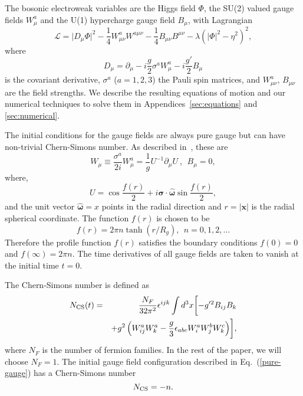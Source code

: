 \documentclass[prd,twocolumn,nofootinbib]{revtex4-1}
\newcommand{\be}{\begin{equation}}
\newcommand{\ee}{\end{equation}}
\begin{document}
The bosonic electroweak variables are the Higgs field $\Phi$, the SU(2) valued gauge
fields $W^a_\mu$ and the U(1) hypercharge gauge field $B_\mu$, with Lagrangian
\begin{equation}
\mathcal{L}=\vert D_\mu \Phi\vert^2-\frac{1}{4} W^a_{\mu\nu} W^{a\mu\nu} 
                    - \frac{1}{4} B_{\mu\nu} B^{\mu\nu} -\lambda (\vert \Phi \vert^2 -\eta^2)^2,
\label{lagrangian}
\end{equation}
where
\be
D_\mu = \partial_\mu - i \frac{g}{2} \sigma^a W^a_\mu - i \frac{g'}{2} B_\mu
\ee
is the covariant derivative,
$\sigma^a$ ($a=1,2,3$) the Pauli spin matrices,
and $W^a_{\mu \nu}$, $B_{\mu \nu}$ are the field strengths.
We describe the resulting equations of motion and our numerical techniques to solve them
in Appendices~\ref{sec:equations} and \ref{sec:numerical}.

The initial conditions for the gauge fields are always pure gauge but can have
non-trivial Chern-Simons number. As described in~\cite{jackiw2000creation}, these are
\begin{equation}
W_\mu \equiv \frac{ \sigma^a}{2i}W^a_{\mu} = \frac{1}{g}U^{-1} \partial_\mu U \ , \ \ B_\mu =0,
\label{pure-gauge}
\end{equation}
where, 
\begin{equation}
U = \cos\frac{f(r)}{2} +i\bm{\sigma}\cdot \hat{\bm{\omega}} 
	\sin \frac{f(r)}{2},
\label{su2-mat}
\end{equation}
and the unit vector $\hat{\bm{\omega}}={\hat x}$ points in the radial direction
and $r=|{\bm x}|$ is the radial spherical coordinate.
The function $f(r)$ is chosen to be
\begin{equation}
f(r) = 2\pi n \tanh(r/R_g), \ \ n=0,1,2,\ldots
\label{fr}
\end{equation}
Therefore the profile function $f(r)$  satisfies the boundary conditions $f(0)=0$ and $f(\infty)=2\pi n$. 
The time derivatives of all gauge fields are taken to vanish at the initial time $t=0$. 

The Chern-Simons number is defined as
\begin{eqnarray}
\nonumber N_{\rm CS}(t) &=& \frac{N_F}{32\pi^2}\epsilon^{ijk}\int d^3x \biggl [-g'^2B_{ij}B_k \\ \
&& +g^2 \left ( W^a_{ij} W^a_k -\frac{g}{3} \epsilon_{abc} W^a_i W^b_j W^c_k \right ) \biggr ],
\label{cs}
\end{eqnarray}
where $N_F$ is the number of
fermion families. In the rest of the paper, we will choose $N_F=1$. 
The initial gauge field configuration described in 
Eq.~(\ref{pure-gauge}) has a Chern-Simons number
\begin{equation}
N_{\rm CS}= - n.
\end{equation}
\end{document}
